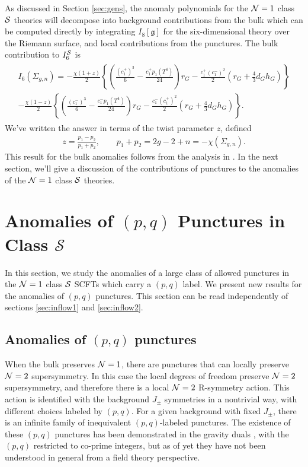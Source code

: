 \documentclass[a4paper,11pt]{article}
\newcommand{\ba}[1]{\begin{align} #1 \end{align} }
\newcommand{\bs}[1]{\begin{split} #1 \end{split} }
\def\CN{{\cal N}}
\def\CS{{\cal S}}
\begin{document}
As discussed in Section \ref{sec:gens}, the anomaly polynomials for the $\CN=1$ class $\CS$ theories will decompose into background contributions from the bulk which can be computed directly by integrating $I_8[\mathfrak{g}]$ for the six-dimensional theory over the Riemann surface, and local contributions from the punctures. The bulk contribution to $I_6^{\CS}$ is  
	\ba{\bs{
	I_6(\Sigma_{g,n})=-\frac{\chi(1+z)}{2} \left\{ \left(\frac{\left(c_1^+\right)^3}{6}-\frac{c_1^+p_1(T^4)}{24}\right)r_G - \frac{c_1^+\left(c_1^-\right)^2}{2}\left( r_G + \frac{4}{3}d_Gh_G\right) \right\}\\
	-\frac{\chi(1-z)}{2} \left\{ \left(\frac{\left( c_1^-\right)^3}{6}-\frac{c_1^-p_1(T^4)}{24}\right)r_G - \frac{c_1^-\left(c_1^+\right)^2}{2}\left( r_G + \frac{4}{3}d_Gh_G\right) \right\}.
	}}
We've written the answer in terms of the twist parameter $z$, defined
	\ba{
	z=\frac{p_1-p_2}{p_1+p_2},\qquad p_1+p_2=2g-2+n=-\chi(\Sigma_{g,n}).\label{eq:twist}
	}	
This result for the bulk anomalies follows from the analysis in \cite{Bah:2012dg}. In the next section, we'll give a discussion of the contributions of punctures to the anomalies of the $\CN=1$ class $\CS$ theories.


\section{Anomalies of $(p,q)$ Punctures in Class $\mathcal{S}$} \label{sec:n1}

In this section, we study the anomalies of a large class of allowed punctures in the  $\CN=1$ class $\CS$ SCFTs which carry a $(p,q)$ label. We present new results for the anomalies of $(p,q)$ punctures. This section can be read independently of sections \ref{sec:inflow1} and \ref{sec:inflow2}.



\subsection{Anomalies of $(p,q)$ punctures}%
\label{sec:pqs}


When the bulk preserves $\CN=1$, there are punctures that can locally preserve $\CN=2$ supersymmetry. In this case the local degrees of freedom preserve $\CN=2$ supersymmetry, and therefore there is a local $\CN=2$ R-symmetry action. This action is identified with the background $J_\pm$ symmetries in a nontrivial way, with different choices labeled by $(p,q)$. For a given background with fixed $J_\pm$, there is an infinite family of inequivalent $(p,q)$-labeled punctures. The existence of these $(p,q)$ punctures has been demonstrated in the gravity duals \cite{Bah:2015fwa}, with the $(p,q)$ restricted to co-prime integers, but as of yet they have not been understood in general from a field theory perspective.
\end{document}
